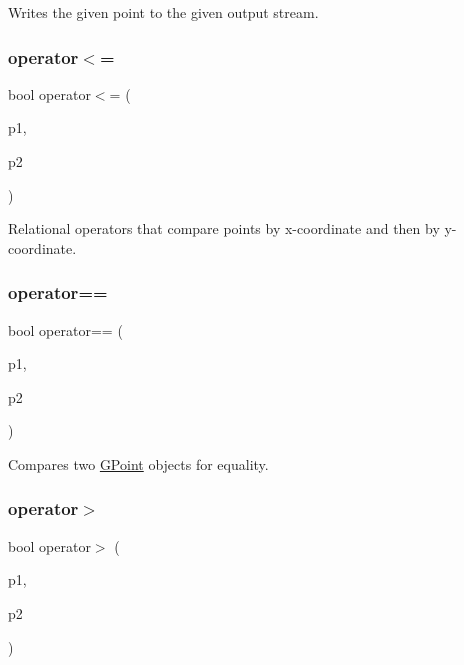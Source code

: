 Writes the given point to the given output stream. 

\mbox{\label{classGPoint_a5b9606369659c394b2494828cb199b91}} 
\subsubsection{\texorpdfstring{operator$<$=}{operator<=}}
{\footnotesize\ttfamily bool operator$<$= (\begin{DoxyParamCaption}\item[{const \mbox{\hyperlink{classGPoint}{G\+Point}} \&}]{p1,  }\item[{const \mbox{\hyperlink{classGPoint}{G\+Point}} \&}]{p2 }\end{DoxyParamCaption})\hspace{0.3cm}{\ttfamily [friend]}}



Relational operators that compare points by x-\/coordinate and then by y-\/coordinate. 

\mbox{\label{classGPoint_a128ff5199debc26d8f040bbd46f40a67}} 
\subsubsection{\texorpdfstring{operator==}{operator==}}
{\footnotesize\ttfamily bool operator== (\begin{DoxyParamCaption}\item[{const \mbox{\hyperlink{classGPoint}{G\+Point}} \&}]{p1,  }\item[{const \mbox{\hyperlink{classGPoint}{G\+Point}} \&}]{p2 }\end{DoxyParamCaption})\hspace{0.3cm}{\ttfamily [friend]}}



Compares two \mbox{\hyperlink{classGPoint}{G\+Point}} objects for equality. 

\mbox{\label{classGPoint_a2ef77d4bff099bb0440be3bde3341bd1}} 
\subsubsection{\texorpdfstring{operator$>$}{operator>}}
{\footnotesize\ttfamily bool operator$>$ (\begin{DoxyParamCaption}\item[{const \mbox{\hyperlink{classGPoint}{G\+Point}} \&}]{p1,  }\item[{const \mbox{\hyperlink{classGPoint}{G\+Point}} \&}]{p2 }\end{DoxyParamCaption})\hspace{0.3cm}{\ttfamily [friend]}}



